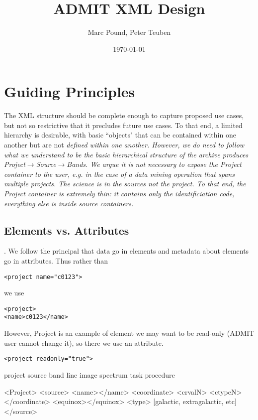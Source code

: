 \documentclass{report}
\title{ADMIT XML Design}
\author{Marc Pound, Peter Teuben}
\date{\today}
\begin{document}
\maketitle

\section{Guiding Principles}
The XML structure should be complete enough to capture proposed use cases,
but not so restrictive that it precludes future use cases. To that end, a
limited hierarchy is desirable, with basic ``objects" that can be contained
within one another but are not \it{defined} within one another.  However, we
do need to follow what we understand to be the basic hierarchical structure
of the archive produces Project$\rightarrow$Source$\rightarrow$Bands.
We argue it is not necessary to expose the Project container to
the user, e.g. in the case of a data mining operation that spans multiple
projects. The science is in the sources not the project. To that end, the
Project container is extremely thin: it contains only the identificiation
code, everything else is inside source containers.

\subsection{Elements vs. Attributes}.  
We follow the principal that data go in elements and metadata about
elements go in attributes.   Thus rather than

\begin{verbatim}
<project name="c0123">  
\end{verbatim}

we use 

\begin{verbatim}
<project>
<name>c0123</name>
\end{verbatim}

However, Project is an example of element we may want to be read-only (ADMIT 
user cannot change it), so there we use an attribute.

\begin{verbatim}
<project readonly="true">
\end{verbatim}

project
    source
        band
        line 
        image
        spectrum
        task
        procedure
    


<Project>
<source>
    <name></name>
    <coordinate>
        <crvalN>
        <ctypeN>
    </coordinate>
    <equinox></equinox>
    <type> [galactic, extragalactic, etc]
</source>
\end{document}
